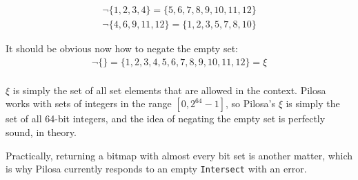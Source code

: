 \documentclass{article}
\begin{document}
\begin{align} 
\neg \{1, 2, 3, 4\} = \{5, 6, 7, 8, 9, 10, 11, 12\}\\
\neg \{4, 6, 9, 11, 12\} = \{1, 2, 3, 5, 7, 8, 10\}
\end{align}

It should be obvious now how to negate the empty set:
\begin{align} 
\neg \{\} = \{1, 2, 3, 4, 5, 6, 7, 8, 9, 10, 11, 12\} = \xi\\
\end{align}

$\xi$ is simply the set of all set elements that are allowed in the context. Pilosa works with sets of integers in the range $[0, 2^{64}-1]$, so Pilosa's $\xi$ is simply the set of all 64-bit integers, and the idea of negating the empty set is perfectly sound, in theory. 

Practically, returning a bitmap with almost every bit set is another matter, which is why Pilosa currently responds to an empty \texttt{Intersect} with an error.
\end{document}
